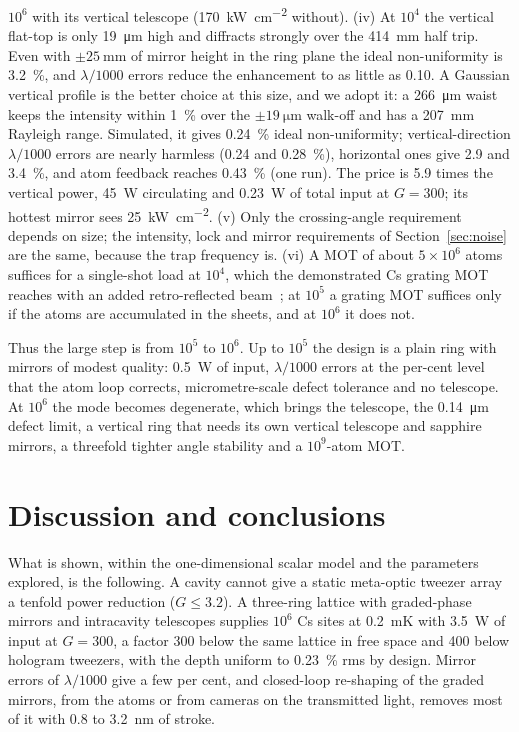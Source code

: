 \documentclass[11pt]{article}
\begin{document}
$10^{6}$ with its vertical telescope (\SI{170}{\kilo\watt\per\centi\metre\squared} without). (iv) At $10^{4}$ the vertical flat-top is only \SI{19}{\micro\metre} high and diffracts
strongly over the \SI{414}{\milli\metre} half trip. Even with $\pm\SI{25}{\milli\metre}$ of mirror height in
the ring plane the ideal non-uniformity is \SI{3.2}{\percent}, and $\lambda/1000$ errors reduce the
enhancement to as little as 0.10. A Gaussian vertical profile is the better choice at this size, and we adopt it: a
\SI{266}{\micro\metre} waist keeps the intensity within \SI{1}{\percent} over the $\pm\SI{19}{\micro\metre}$
walk-off and has a \SI{207}{\milli\metre} Rayleigh range. Simulated, it gives \SI{0.24}{\percent} ideal
non-uniformity; vertical-direction $\lambda/1000$ errors are nearly harmless (0.24 and \SI{0.28}{\percent}),
horizontal ones give 2.9 and \SI{3.4}{\percent}, and atom feedback reaches \SI{0.43}{\percent} (one run). The
price is 5.9 times the vertical power, \SI{45}{\watt} circulating and \SI{0.23}{\watt} of total input at
$G = 300$; its hottest mirror sees \SI{25}{\kilo\watt\per\centi\metre\squared}.
(v) Only the crossing-angle requirement depends on size; the intensity, lock and mirror requirements of
Section~\ref{sec:noise} are the same, because the trap frequency is. (vi) A MOT of about
$5\times10^{6}$ atoms suffices for a single-shot load at $10^{4}$, which the demonstrated Cs grating MOT
reaches with an added retro-reflected beam~\cite{Takamizawa2025}; at $10^{5}$ a grating MOT suffices only
if the atoms are accumulated in the sheets, and at $10^{6}$ it does not.

Thus the large step is from $10^{5}$ to $10^{6}$. Up to $10^{5}$ the design is a plain ring with mirrors of
modest quality: \SI{0.5}{\watt} of input, $\lambda/1000$ errors at the per-cent level that the atom loop
corrects, micrometre-scale defect tolerance and no telescope. At $10^{6}$ the mode becomes degenerate,
which brings the telescope, the \SI{0.14}{\micro\metre} defect limit, a vertical ring that needs its own
vertical telescope and sapphire mirrors, a threefold tighter angle stability and a
$10^{9}$-atom MOT.

\section{Discussion and conclusions}
\label{sec:discussion}

What is shown, within the one-dimensional scalar model and the parameters explored, is the
following. A cavity cannot give a static meta-optic tweezer array a tenfold power reduction
($G \le 3.2$). A three-ring lattice with graded-phase mirrors and intracavity telescopes supplies
$10^{6}$ Cs sites at \SI{0.2}{\milli\kelvin} with \SI{3.5}{\watt} of input at $G = 300$, a factor 300
below the same lattice in free space and 400 below hologram tweezers, with the depth uniform to
\SI{0.23}{\percent} rms by design. Mirror errors of $\lambda/1000$ give a few per cent, and closed-loop
re-shaping of the graded mirrors, from the atoms or from cameras on the transmitted light, removes most
of it with 0.8 to \SI{3.2}{\nano\metre} of stroke.
\end{document}
